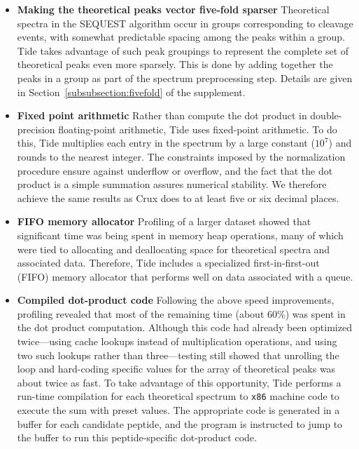 \begin{itemize}
\item {\bf Making the theoretical peaks vector five-fold sparser}
  Theoretical spectra in the SEQUEST algorithm occur in groups
  corresponding to cleavage events, with somewhat predictable spacing
  among the peaks within a group. Tide takes advantage of such peak
  groupings to represent the complete set of theoretical peaks even
  more sparsely. This is done by adding together the peaks in a group
  as part of the spectrum preprocessing step. Details are given in
  Section~\ref{subsubsection:fivefold} of the supplement.

\item {\bf Fixed point arithmetic} Rather than compute the dot product
  in double-precision floating-point arithmetic, Tide uses fixed-point
  arithmetic. To do this, Tide multiplies each entry in the spectrum
  by a large constant ($10^7$) and rounds to the nearest integer. The
  constraints imposed by the normalization procedure ensure against
  underflow or overflow, and the fact that the dot product is a simple
  summation assures numerical stability. We therefore achieve the same
  results as Crux does to at least five or six decimal places.

\item {\bf FIFO memory allocator} Profiling of a larger dataset showed
  that significant time was being spent in memory heap operations,
  many of which were tied to allocating and deallocating space for
  theoretical spectra and associated data. Therefore, Tide includes a
  specialized first-in-first-out (FIFO) memory allocator that performs
  well on data associated with a queue.

\item {\bf Compiled dot-product code} Following the above speed
  improvements, profiling revealed that most of the remaining time
  (about $60\%$) was spent in the dot product computation.  Although
  this code had already been optimized twice---using cache lookups
  instead of multiplication operations, and using two such lookups
  rather than three---testing still showed that unrolling the loop
  and hard-coding specific values for the array of theoretical peaks
  was about twice as fast.  To take advantage of this opportunity,
  Tide performs a run-time compilation for each theoretical spectrum
  to {\tt x86} machine code to execute the sum with preset values. The
  appropriate code is generated in a buffer for each candidate
  peptide, and the program is instructed to jump to the buffer to run
  this peptide-specific dot-product code.

\end{itemize}

